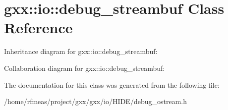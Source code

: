 \hypertarget{classgxx_1_1io_1_1debug__streambuf}{}\section{gxx\+:\+:io\+:\+:debug\+\_\+streambuf Class Reference}
\label{classgxx_1_1io_1_1debug__streambuf}


Inheritance diagram for gxx\+:\+:io\+:\+:debug\+\_\+streambuf\+:


Collaboration diagram for gxx\+:\+:io\+:\+:debug\+\_\+streambuf\+:


The documentation for this class was generated from the following file\+:\begin{DoxyCompactItemize}
\item 
/home/rfmeas/project/gxx/gxx/io/\+H\+I\+D\+E/debug\+\_\+ostream.\+h\end{DoxyCompactItemize}
